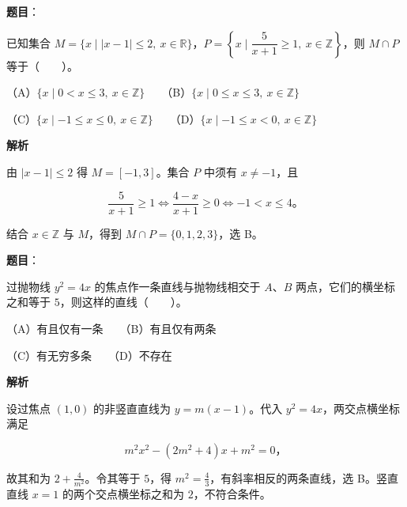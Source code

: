 \begin{answer}

\textbf{题目}：

已知集合 $M=\{x\mid |x-1|\leqslant2,\ x\in\mathbb R\}$，$P=\left\{x\mid\dfrac{5}{x+1}\geqslant1,\ x\in\mathbb Z\right\}$，则 $M\cap P$ 等于\mbox{（　　）}。

（A）$\{x\mid 0<x\leqslant3,\ x\in\mathbb Z\}$　　（B）$\{x\mid 0\leqslant x\leqslant3,\ x\in\mathbb Z\}$

（C）$\{x\mid -1\leqslant x\leqslant0,\ x\in\mathbb Z\}$　　（D）$\{x\mid -1\leqslant x<0,\ x\in\mathbb Z\}$

\textbf{解析}

由 $|x-1|\le2$ 得 $M=[-1,3]$。集合 $P$ 中须有 $x\ne-1$，且

\nopagebreak[4]
\[
\frac{5}{x+1}\ge1\iff\frac{4-x}{x+1}\ge0\iff -1<x\le4\mbox{。}
\]

结合 $x\in\mathbb Z$ 与 $M$，得到 $M\cap P=\{0,1,2,3\}$，选 B。


\end{answer}
\begin{answer}

\textbf{题目}：

过抛物线 $y^2=4x$ 的焦点作一条直线与抛物线相交于 $A$、$B$ 两点，它们的横坐标之和等于 $5$，则这样的直线\mbox{（　　）}。

（A）有且仅有一条　　（B）有且仅有两条

（C）有无穷多条　　（D）不存在

\textbf{解析}

设过焦点 $(1,0)$ 的非竖直直线为 $y=m(x-1)$。代入 $y^2=4x$，两交点横坐标满足

\nopagebreak[4]
\[
m^2x^2-(2m^2+4)x+m^2=0\text{，}
\]

故其和为 $2+\frac4{m^2}$。令其等于 $5$，得 $m^2=\frac43$，有斜率相反的两条直线，选 B。竖直直线 $x=1$ 的两个交点横坐标之和为 $2$，不符合条件。


\end{answer}
